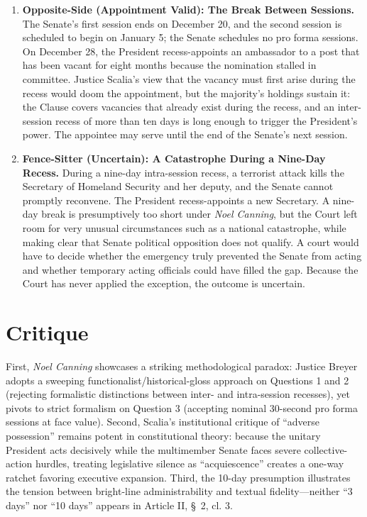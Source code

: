 \documentclass[12pt]{article}
\begin{document}
\begin{enumerate}
\item \textbf{Opposite-Side (Appointment Valid): The Break Between Sessions.} The Senate's first session ends on December 20, and the second session is scheduled to begin on January 5; the Senate schedules no pro forma sessions. On December 28, the President recess-appoints an ambassador to a post that has been vacant for eight months because the nomination stalled in committee. Justice Scalia's view that the vacancy must first arise during the recess would doom the appointment, but the majority's holdings sustain it: the Clause covers vacancies that already exist during the recess, and an inter-session recess of more than ten days is long enough to trigger the President's power. The appointee may serve until the end of the Senate's next session.

\item \textbf{Fence-Sitter (Uncertain): A Catastrophe During a Nine-Day Recess.} During a nine-day intra-session recess, a terrorist attack kills the Secretary of Homeland Security and her deputy, and the Senate cannot promptly reconvene. The President recess-appoints a new Secretary. A nine-day break is presumptively too short under \textit{Noel Canning}, but the Court left room for very unusual circumstances such as a national catastrophe, while making clear that Senate political opposition does not qualify. A court would have to decide whether the emergency truly prevented the Senate from acting and whether temporary acting officials could have filled the gap. Because the Court has never applied the exception, the outcome is uncertain.

\end{enumerate}

\section{Critique}
First, \emph{Noel Canning} showcases a striking methodological paradox: Justice Breyer adopts a sweeping functionalist/historical-gloss approach on Questions 1 and 2 (rejecting formalistic distinctions between inter- and intra-session recesses), yet pivots to strict formalism on Question 3 (accepting nominal 30-second pro forma sessions at face value). Second, Scalia's institutional critique of ``adverse possession'' remains potent in constitutional theory: because the unitary President acts decisively while the multimember Senate faces severe collective-action hurdles, treating legislative silence as ``acquiescence'' creates a one-way ratchet favoring executive expansion. Third, the 10-day presumption illustrates the tension between bright-line administrability and textual fidelity---neither ``3 days'' nor ``10 days'' appears in Article II, \S~2, cl. 3.
\end{document}
